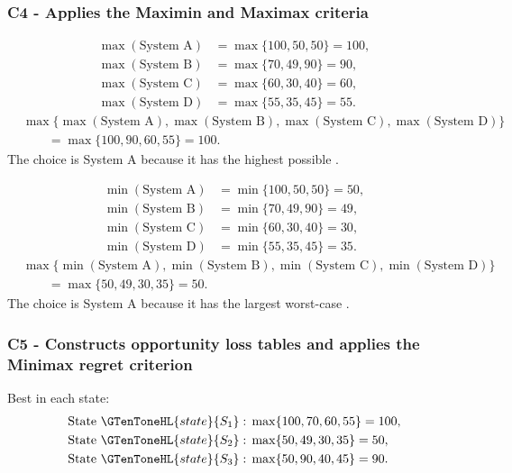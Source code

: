 	\subsubsection*{C4 - Applies the Maximin and Maximax criteria}
	\label{subsec:production-system-3x4-c4}
	
	\[
	\begin{aligned}
		\max(\text{System A}) &= \max\{100,50,50\}=100,\\
		\max(\text{System B}) &= \max\{70,49,90\}=90,\\
		\max(\text{System C}) &= \max\{60,30,40\}=60,\\
		\max(\text{System D}) &= \max\{55,35,45\}=55.
	\end{aligned}
	\]
	\[
	\begin{aligned}
		&\max\{\max(\text{System A}),\max(\text{System B}),
		\max(\text{System C}),\max(\text{System D})\}\\
		&\qquad=\max\{100,90,60,55\}
		=100.
	\end{aligned}
	\]
	The  choice is System A because it has the highest possible .
	
	\[
	\begin{aligned}
		\min(\text{System A}) &= \min\{100,50,50\}=50,\\
		\min(\text{System B}) &= \min\{70,49,90\}=49,\\
		\min(\text{System C}) &= \min\{60,30,40\}=30,\\
		\min(\text{System D}) &= \min\{55,35,45\}=35.
	\end{aligned}
	\]
	\[
	\begin{aligned}
		&\max\{\min(\text{System A}),\min(\text{System B}),
		\min(\text{System C}),\min(\text{System D})\}\\
		&\qquad=\max\{50,49,30,35\}
		=50.
	\end{aligned}
	\]
	The  choice is System A because it has the largest worst-case .
	
	\subsubsection*{C5 - Constructs opportunity loss tables and applies the Minimax regret criterion}
	\label{subsec:production-system-3x4-c5}
	
	Best  in each state:
	\[
	\begin{aligned}
		\text{State }\GTenToneHL{state}{S_1}:\;&\max\{100,70,60,55\}=100,\\
		\text{State }\GTenToneHL{state}{S_2}:\;&\max\{50,49,30,35\}=50,\\
		\text{State }\GTenToneHL{state}{S_3}:\;&\max\{50,90,40,45\}=90.
	\end{aligned}
	\]
	
